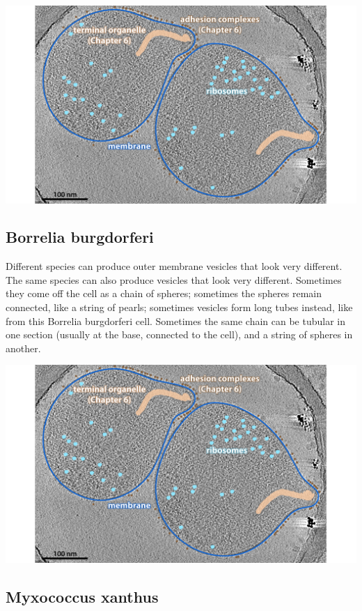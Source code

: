 \documentclass[]{tufte-book}
\begin{document}
\includegraphics{img/02_static/2_1_Mgenitalium}

\hypertarget{Vesicle_morphologies}{\subsection{Borrelia
burgdorferi}\label{Vesicle_morphologies}}

Different species can produce outer membrane vesicles that look very
different. The same species can also produce vesicles that look very
different. Sometimes they come off the cell as a chain of spheres;
sometimes the spheres remain connected, like a string of pearls;
sometimes vesicles form long tubes instead, like from this Borrelia
burgdorferi cell. Sometimes the same chain can be tubular in one section
(usually at the base, connected to the cell), and a string of spheres in
another.

\includegraphics{img/02_static/2_1_Mgenitalium}

\subsection{Myxococcus xanthus}\label{Inner_membrane_vesicles}
\end{document}
